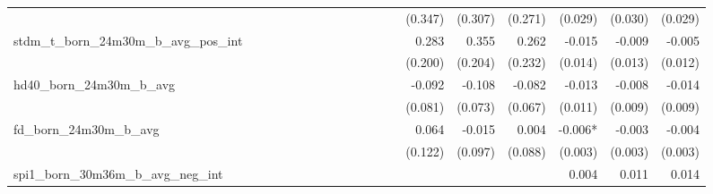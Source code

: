 \begin{tabular}{lrrrrrrrrrrrrrrrrrr}
                                            &              &              &              &              &              &              &              &              &               &              &              &               &      (0.347) &      (0.307) &       (0.271) &      (0.029) &      (0.030) &       (0.029) \\ 
stdm\_t\_born\_24m30m\_b\_avg\_pos\_int     &              &              &              &              &              &              &              &              &               &              &              &               &        0.283 &        0.355 &         0.262 &       -0.015 &       -0.009 &        -0.005 \\ 
                                            &              &              &              &              &              &              &              &              &               &              &              &               &      (0.200) &      (0.204) &       (0.232) &      (0.014) &      (0.013) &       (0.012) \\ 
hd40\_born\_24m30m\_b\_avg                  &              &              &              &              &              &              &              &              &               &              &              &               &       -0.092 &       -0.108 &        -0.082 &       -0.013 &       -0.008 &        -0.014 \\ 
                                            &              &              &              &              &              &              &              &              &               &              &              &               &      (0.081) &      (0.073) &       (0.067) &      (0.011) &      (0.009) &       (0.009) \\ 
fd\_born\_24m30m\_b\_avg                    &              &              &              &              &              &              &              &              &               &              &              &               &        0.064 &       -0.015 &         0.004 &      -0.006* &       -0.003 &        -0.004 \\ 
                                            &              &              &              &              &              &              &              &              &               &              &              &               &      (0.122) &      (0.097) &       (0.088) &      (0.003) &      (0.003) &       (0.003) \\ 
spi1\_born\_30m36m\_b\_avg\_neg\_int        &              &              &              &              &              &              &              &              &               &              &              &               &              &              &               &        0.004 &        0.011 &         0.014 \\ 

\end{tabular}
